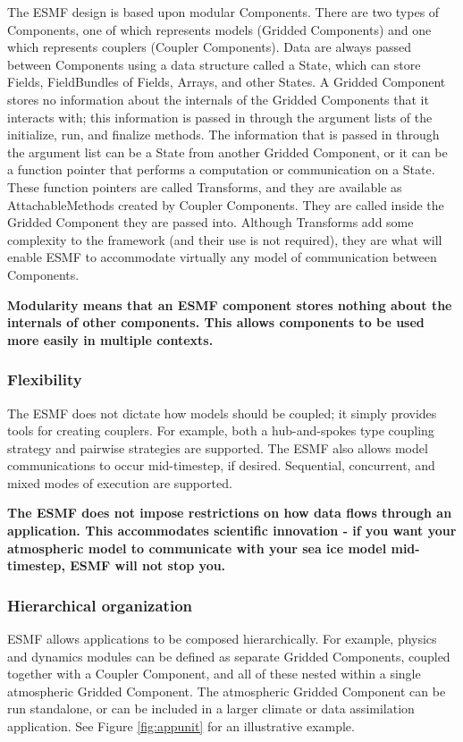 The ESMF design is based upon modular Components.  There
are two types of Components, one of which represents models 
(Gridded Components) and one which represents couplers (Coupler Components).  
Data are always passed between Components using a data structure 
called a State, which can store Fields, FieldBundles of Fields,
Arrays, and other States.  A Gridded Component stores no information about 
the internals of the Gridded Components that it interacts with; this information 
is passed in through the argument lists of the initialize, run, 
and finalize methods.  The information that is 
passed in through the argument list can be a State from 
another Gridded Component, or it can be a function pointer that performs
a computation or communication on a State.  These function 
pointers are called Transforms, and they are available as AttachableMethods
created by Coupler Components.  They are called inside the 
Gridded Component they are passed into.  Although Transforms add 
some complexity to the framework (and their use is not required), they are what 
will enable ESMF to accommodate virtually any model of communication 
between Components. 

{\bf Modularity means that an ESMF component stores nothing about 
the internals of other components.  This allows components to be 
used more easily in multiple contexts.}

\subsubsection{Flexibility}
The ESMF does not dictate how models should be coupled; it
simply provides tools for creating couplers.  For example, 
both a hub-and-spokes type coupling strategy and  
pairwise strategies are supported.  The ESMF also allows model
communications to occur mid-timestep, if desired.  Sequential, 
concurrent, and mixed modes of execution are supported.  

{\bf The ESMF does not impose restrictions on how data flows through 
an application.  This accommodates scientific innovation - if you 
want your atmospheric model to communicate with your sea ice model
mid-timestep, ESMF will not stop you.}

\subsubsection{Hierarchical organization}
\label{sec:principles-hierarchy}
ESMF allows applications to be composed hierarchically.
For example, physics and dynamics modules can be defined as 
separate Gridded Components, coupled together with a Coupler Component, and all
of these nested within a single atmospheric Gridded Component.
The atmospheric Gridded Component can be run standalone, or can be included
in a larger climate or data assimilation application.  See Figure
\ref{fig:appunit} for an illustrative example.

